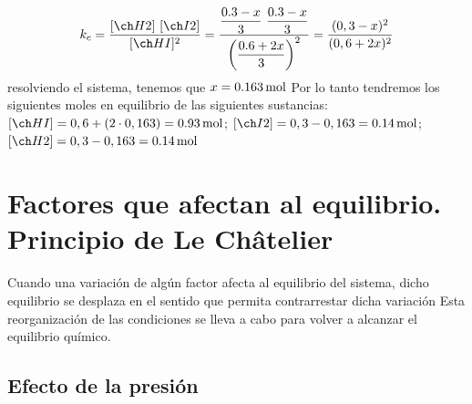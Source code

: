 \begin{example}
\begin{enumerate}[label=\letraminuscula]
            \begin{gather*}
                k_c = \dfrac{\conc{H2}\ \conc{I2}}{\conc{HI}^2} = \dfrac{\dfrac{0.3-x}{3}\ \dfrac{0.3 - x}{3}}{\left(\dfrac{0.6+ 2x}{3}\right)^2} = \dfrac{(0,3-x)^2}{(0,6+2x)^2}
            \end{gather*}
            resolviendo el sistema, tenemos que $x = \SI{0,163}{\mole}$
            Por lo tanto tendremos los siguientes moles en equilibrio de las siguientes sustancias: $\conc{HI} = 0,6 + (2\cdot 0,163) = \moles{0,93} $; $\conc{I2} = 0,3 - 0,163 = \moles{0,14}$; $\conc{H2} = 0,3 - 0,163 = \moles{0,14} $
    \end{enumerate}
\end{example}


\section{Factores que afectan al equilibrio. Principio de Le Châtelier}\label{sec:factores-que-afectan-al-equilibrio.-principio-de-le-chatelier}

\begin{ley}
     Cuando una variación de algún factor afecta al equilibrio del sistema, dicho equilibrio se desplaza en el sentido que permita contrarrestar dicha variación
Esta reorganización de las condiciones se lleva a cabo para volver a alcanzar el equilibrio químico.
\end{ley}


\subsection{Efecto de la presión}\label{subsec:efecto-de-la-presion}


